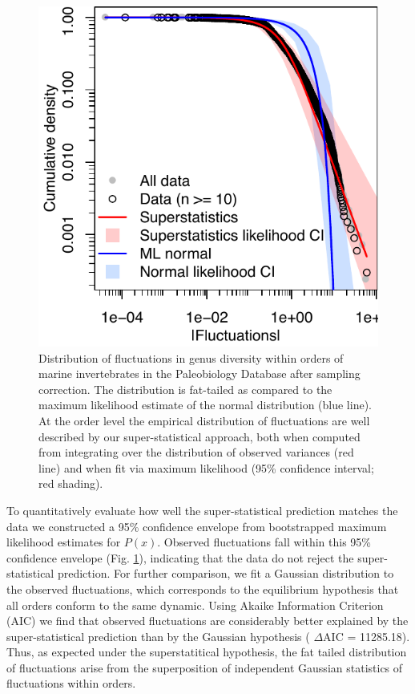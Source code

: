 \documentclass[12pt]{article}
\let\citep=\cite
\begin{document}
\begin{figure}[!h]
  \centering
  \includegraphics[scale=1]{figs/fig_Px.pdf} 
  \caption[Order-level distribution of diversity
  fluctuations]{Distribution of fluctuations in genus diversity within
    orders of marine invertebrates in the Paleobiology Database
    \citep{alroy08} after sampling correction. The distribution is
    fat-tailed as compared to the maximum likelihood estimate of the
    normal distribution (blue line).  At the order level the empirical
    distribution of fluctuations are well described by our
    super-statistical approach, both when computed from integrating
    over the distribution of observed variances (red line) and when
    fit via maximum likelihood (95\% confidence interval; red
    shading).}
  \label{fig:Px}
\end{figure}

To quantitatively evaluate how well the super-statistical prediction
matches the data we constructed a 95\% confidence envelope from
bootstrapped maximum likelihood estimates for $P(x)$. Observed
fluctuations fall within this 95\% confidence envelope
(Fig. \ref{fig:Px}), indicating that the data do not reject the
super-statistical prediction. For further comparison, we fit a
Gaussian distribution to the observed fluctuations, which corresponds
to the equilibrium hypothesis that all orders conform to the same
dynamic. Using Akaike Information Criterion (AIC) we find that
observed fluctuations are considerably better explained by the
super-statistical prediction than by the Gaussian hypothesis ({\small
  $\Delta$}AIC = 11285.18). Thus, as expected under the
superstatitical hypothesis, the fat tailed distribution of
fluctuations arise from the superposition of independent Gaussian
statistics of fluctuations within orders.
\end{document}
